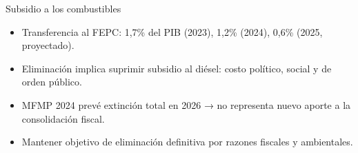 \begin{frame}{Subsidio a los combustibles}
\begin{itemize}
    \item Transferencia al FEPC: 1,7\% del PIB (2023), 1,2\% (2024), 0,6\% (2025, proyectado).
    \item Eliminación implica suprimir subsidio al diésel: costo político, social y de orden público.
    \item MFMP 2024 prevé extinción total en 2026 → no representa nuevo aporte a la consolidación fiscal.
    \item Mantener objetivo de eliminación definitiva por razones fiscales y ambientales.
\end{itemize}
\end{frame}
